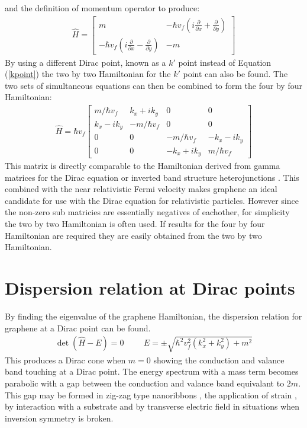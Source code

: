 			and the definition of momentum operator to produce:
			\begin{align}
				\hat{H}=\left[\begin{array}{ccc}
					m&-\hbar v_{f}\left(i\frac{\partial}{\partial x}+\frac{\partial}{\partial y}\right)\\
					-\hbar v_{f}\left(i\frac{\partial}{\partial x}-\frac{\partial}{\partial y}\right)&-m
				\end{array}\right]
			\end{align}
			By using a different Dirac point, known as a $k'$ point instead of Equation (\ref{kpoint}) the two by two Hamiltonian for the $k'$ point can also be found. The two sets of simultaneous equations can then be combined to form the four by four Hamiltonian:
			\begin{align}
				\hat{H}=\hbar v_{f}\left[\begin{array}{cccc}
					m/\hbar v_{f}&k_{x}+ik_{y}&0&0\\
					k_{x}-ik_{y}&-m/\hbar v_{f}&0&0\\
					0&0&-m/\hbar v_{f}&-k_{x}-ik_{y}\\
					0&0&-k_{x}+ik_{y}&m/\hbar v_{f}
				\end{array}\right]
			\end{align}
			This matrix is directly comparable to the Hamiltonian derived from gamma matrices for the Dirac equation or inverted band structure heterojunctions \cite{b41}. This combined with the near relativistic Fermi velocity makes graphene an ideal candidate for use with the Dirac equation for relativistic particles. However since the non-zero sub matricies are essentially negatives of eachother, for simplicity the two by two Hamiltonian is often used. If results for the four by four Hamiltonian are required they are easily obtained from the two by two Hamiltonian.
		\section{Dispersion relation at Dirac points}
		\label{Introduction - Dispersion relation at Dirac points}
			By finding the eigenvalue of the graphene Hamiltonian, the dispersion relation for graphene at a Dirac point can be found.
			\begin{align}
				\det\left(\hat{H}-E\right)=0\hspace{1cm}E=\pm\sqrt{\hbar^{2}v_{f}^{2}\left(k_{x}^{2}+k_{y}^{2}\right)+m^{2}}
				\label{introduction-ekm}
			\end{align}
			This produces a Dirac cone when $m=0$ \cite{b5, b55} showing the conduction and valance band touching at a Dirac point. The energy spectrum with a mass term \cite{b46, b47, b4, b55} becomes parabolic with a gap between the conduction and valance band equivalant to $2m$. This gap may be formed in zig-zag type nanoribbons \cite{b1}, the application of strain \cite{b59}, by interaction with a substrate and by transverse electric field \cite{b47} in situations when inversion symmetry is broken.

